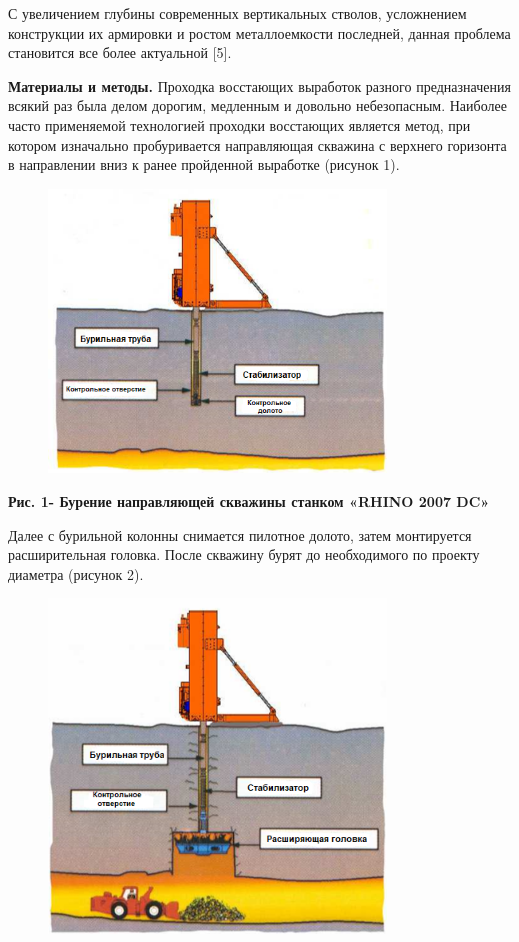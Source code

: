 С увеличением глубины современных вертикальных стволов, усложнением
конструкции их армировки и ростом металлоемкости последней, данная
проблема становится все более актуальной {[}5{]}.

{\bfseries Материалы и методы.} Проходка восстающих выработок разного
предназначения всякий раз была делом дорогим, медленным и довольно
небезопасным. Наиболее часто применяемой технологией проходки восстающих
является метод, при котором изначально пробуривается направляющая
скважина с верхнего горизонта в направлении вниз к ранее пройденной
выработке (рисунок 1).

\begin{figure}[H]
	\centering
	\includegraphics[width=0.8\textwidth]{assets/1121}
	\caption*{}
\end{figure}

{\bfseries Рис. 1- Бурение направляющей скважины станком «RHINO 2007 DC»}

Далее с бурильной колонны снимается пилотное долото, затем монтируется
расширительная головка. После скважину бурят до необходимого по проекту
диаметра (рисунок 2).

\begin{figure}[H]
	\centering
	\includegraphics[width=0.8\textwidth]{assets/1122}
	\caption*{}
\end{figure}

